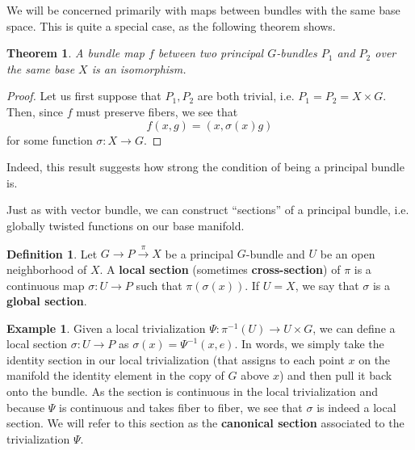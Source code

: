 \documentclass{book}
\theoremstyle{plain}
\newtheorem{thm}{Theorem}
\theoremstyle{definition}
\newtheorem{defn}{Definition}
\newtheorem{exmp}{Example}
\theoremstyle{remark}
\begin{document}
We will be concerned primarily with maps between bundles with the same base space. This is quite a special case, as the following theorem shows.
\begin{thm}
    A bundle map $f$ between two principal $G$-bundles $P_1$ and $P_2$ over the same base $X$ is an isomorphism.
\end{thm}
\begin{proof}
    Let us first suppose that $P_1,P_2$ are both trivial, i.e. $P_1=P_2=X\times G$. Then, since $f$ must preserve fibers, we see that
    \[f(x,g)=(x,\sigma(x)g)\]
    for some function $\sigma:X\to G$.
\end{proof}
Indeed, this result suggests how strong the condition of being a principal bundle is.



Just as with vector bundle, we can construct ``sections'' of a principal bundle, i.e. globally twisted functions on our base manifold.

\begin{defn}
    Let $G\to P\overset{\pi}{\to} X$ be a principal $G$-bundle and $U$ be an open neighborhood of $X$. A \textbf{local section} (sometimes \textbf{cross-section}) of $\pi$ is a continuous map $\sigma: U\to P$ such that $\pi(\sigma(x))$. If $U=X$, we say that $\sigma$ is a \textbf{global section}.
\end{defn}

\begin{exmp}
    Given a local trivialization $\Psi:\pi^{-1}(U)\to U\times G$, we can define a local section $\sigma:U\to P$ as $\sigma(x)=\Psi^{-1}(x,e)$. In words, we simply take the identity section in our local trivialization (that assigns to each point $x$ on the manifold the identity element in the copy of $G$ above $x$) and then pull it back onto the bundle. As the section is continuous in the local trivialization and because $\Psi$ is continuous and takes fiber to fiber, we see that $\sigma$ is indeed a local section. We will refer to this section as the \textbf{canonical section} associated to the trivialization $\Psi$.
\end{exmp}
\end{document}
